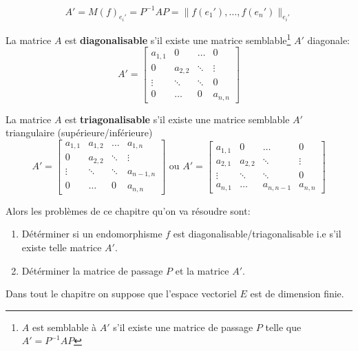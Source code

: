  \[
     A' = M(f)_{e_i'} = P^{-1}AP = \|f(e_1'), \ldots, f(e_n')\|_{e_i'}
\] 
\begin{definition}\label{def:matrice-diagonalisable}
    La matrice $A$ est \textbf{diagonalisable} s'il existe une matrice semblable\footnote{$A$ est semblable à  $A'$ s'il existe une matrice de passage  $P$ telle que  $A' = P^{-1}AP$}  $A'$ diagonale:
     \[
         A' = 
         \begin{bmatrix} 
         a_{1,1} & 0 & \ldots & 0 \\
         0 & a_{2,2} & \ddots & \vdots\\
         \vdots & \ddots & \ddots & 0\\
         0 & \ldots & 0 & a_{n,n}
        \end{bmatrix} 
    \] 
\end{definition}
\begin{definition}
    La matrice $A$ est \textbf{triagonalisable} s'il existe une matrice semblable  $A'$ triangulaire (supérieure/inférieure) 
     \[
         A' = 
         \begin{bmatrix} 
         a_{1,1} & a_{1,2} & \ldots & a_{1,n} \\
         0 & a_{2,2} & \ddots & \vdots\\
         \vdots & \ddots & \ddots & a_{n-1,n}\\
         0 & \ldots & 0 & a_{n,n}
        \end{bmatrix} \text{ ou } 
         A' = 
         \begin{bmatrix} 
         a_{1,1} & 0 & \ldots & 0 \\
         a_{2, 1} & a_{2,2} & \ddots & \vdots\\
         \vdots & \ddots & \ddots & 0\\
         a_{n, 1} & \ldots & a_{n, n-1} & a_{n,n}
        \end{bmatrix} 
    \] 
\end{definition}
Alors les problèmes de ce chapitre qu'on va résoudre sont:
\begin{enumerate}
    \item Détérminer si un endomorphisme $f$ est diagonalisable/triagonalisable i.e s'il existe telle matrice  $A'$.
    \item Détérminer la matrice de passage $P$ et la matrice $A'$.
\end{enumerate}
Dans tout le chapitre on suppose que l'espace vectoriel $E$ est de dimension finie.
